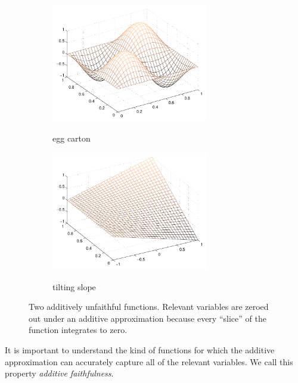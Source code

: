 \begin{figure}[htp]
\vskip-10pt
	\centering
	\begin{subfigure}[b]{0.45\textwidth}
		\centering
		{\includegraphics[width=0.75\textwidth]{figs/sine_wave_funct3}}
		\caption{egg carton}
	\end{subfigure}
	\begin{subfigure}[b]{0.45\textwidth}
		\centering
		{\includegraphics[width=0.75\textwidth]{figs/tilting_slope_funct3}}
		\caption{tilting slope}
	\end{subfigure}	
	
\caption{Two additively unfaithful functions. Relevant variables are
  zeroed out under an additive approximation because every ``slice''
  of the function integrates to zero.}
\vskip-10pt
\end{figure}

It is important to understand the kind of functions for which the
additive approximation can accurately capture all of the relevant variables.
We call this property \emph{additive faithfulness}.

